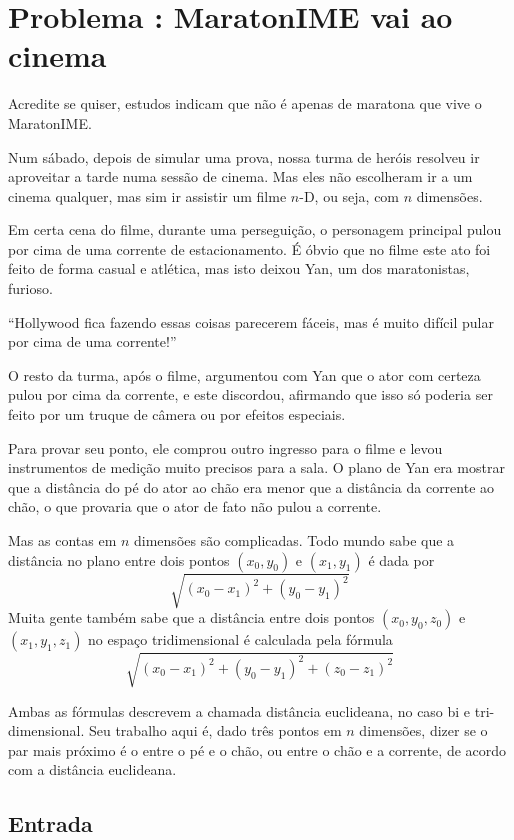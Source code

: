\section*{Problema \proxLetra: MaratonIME vai ao cinema}

Acredite se quiser, estudos indicam que não é apenas de maratona que vive o MaratonIME. 

Num sábado, depois de simular uma prova, nossa turma de heróis resolveu ir aproveitar
a tarde numa sessão de cinema. Mas eles não escolheram ir a um cinema qualquer, mas sim
ir assistir um filme $n$-D, ou seja, com $n$ dimensões.

Em certa cena do filme, durante uma perseguição, o personagem principal pulou por cima
de uma corrente de estacionamento. É óbvio que no filme este ato foi feito de forma 
casual e atlética, mas isto deixou Yan, um dos maratonistas, furioso.

``Hollywood fica fazendo essas coisas parecerem fáceis, mas é muito difícil pular por
cima de uma corrente!''

O resto da turma, após o filme, argumentou com Yan que o ator com certeza pulou por cima
da corrente, e este discordou, afirmando que isso só poderia ser feito por um truque de 
câmera ou por efeitos especiais.

Para provar seu ponto, ele comprou outro ingresso para o filme e levou instrumentos de
medição muito precisos para a sala. O plano de Yan era mostrar que a distância do pé do
ator ao chão era menor que a distância da corrente ao chão, o que provaria que o ator
de fato não pulou a corrente.

Mas as contas em $n$ dimensões são complicadas. Todo mundo sabe que a distância no plano
entre dois pontos $(x_0,y_0)$ e  $(x_1,y_1)$ é dada por
\[ \sqrt{(x_0-x_1)^2 + (y_0-y_1)^2}\]
Muita gente também sabe que a distância entre dois pontos $(x_0,y_0,z_0)$ e $(x_1,y_1,z_1)$
no espaço tridimensional é calculada pela fórmula
\[\sqrt{(x_0-x_1)^2 + (y_0-y_1)^2 + (z_0-z_1)^2}\]

Ambas as fórmulas descrevem a chamada distância euclideana, no caso bi e tri-dimensional.
Seu trabalho aqui é, dado três pontos em $n$ dimensões, dizer se o par mais próximo é o
entre o pé e o chão, ou entre o chão e a corrente, de acordo com a distância euclideana.

\subsection*{Entrada}

